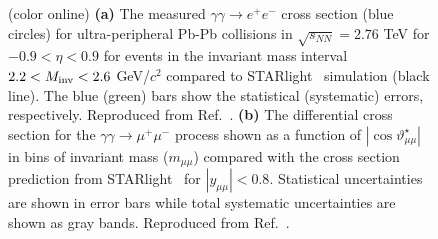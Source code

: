 \documentclass[12pt,epjc3]{svjour3}\sloppy
\begin{document}
\begin{figure}
\begin{subfigure}{.40\textwidth}
      \caption{}
    \end{subfigure}
    \caption{
        (color online) 
    \textbf{(a)} The measured $\gamma\gamma \rightarrow e^+e^-$ cross section (blue circles) for ultra-peripheral Pb-Pb collisions in $\sqrt{s_{NN}} = 2.76$ TeV for $-0.9 < \eta < 0.9$ for events in the invariant mass interval $2.2 <M_{\rm inv} < 2.6$ GeV/$c^2$ compared to STARlight~\cite{kleinSTARlightMonteCarlo2017b} simulation (black line). The blue (green) bars show the statistical (systematic) errors, respectively. Reproduced from Ref.~\cite{abbasCharmoniumPairPhotoproduction2013a}.
    \textbf{(b)} 
    The differential cross section for the $\gamma\gamma \rightarrow \mu^+\mu^-$ process shown as a function of $|\cos \vartheta^{\star}_{\mu\mu}|$ in bins of invariant mass ($m_{\mu\mu}$) compared with the cross section prediction from STARlight~\cite{kleinSTARlightMonteCarlo2017b} for $|y_{\mu\mu}| < 0.8$. Statistical uncertainties are shown in error bars while total systematic uncertainties are shown as gray bands. Reproduced from Ref.~\cite{atlascollaborationExclusiveDimuonProduction2020}.
    }
    \label{fig:starlight_data}
\end{figure}

\end{document}
